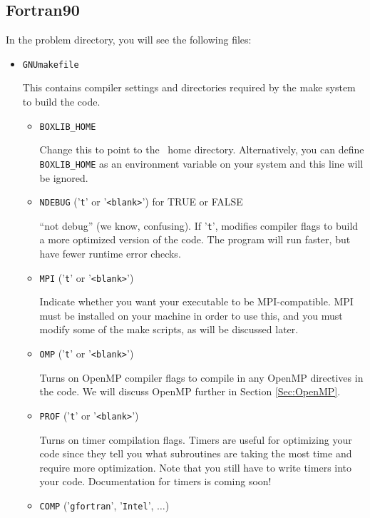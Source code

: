 \subsection{Fortran90}

In the problem directory, you will see the following files:
\begin{itemize}
\item {\tt GNUmakefile}

This contains compiler settings and directories required by the make system to build the code.

  \begin{itemize}

    \item {\tt BOXLIB\_HOME}

    Change this to point to the \BoxLib\ home directory.  Alternatively, you can define {\tt BOXLIB\_HOME}
    as an environment variable on your system and this line will be ignored.

    \item {\tt NDEBUG} ('{\tt t}' or '{\tt <blank>}') for TRUE or FALSE
      
    ``not debug'' (we know, confusing).  If '{\tt t}', modifies compiler flags to build a 
    more optimized version of the code.  The program will run faster, but have fewer 
    runtime error checks.

    \item {\tt MPI} ('{\tt t}' or '{\tt <blank>}')

    Indicate whether you want your executable to be MPI-compatible.  MPI must be installed on your
    machine in order to use this, and you must modify some of the make scripts, as will be 
    discussed later.

    \item {\tt OMP} ('{\tt t}' or '{\tt <blank>}')

    Turns on OpenMP compiler flags to compile in any OpenMP directives in the code.
    We will discuss OpenMP further in Section \ref{Sec:OpenMP}.

    \item {\tt PROF} ('{\tt t}' or '{\tt <blank>}')

    Turns on timer compilation flags.  Timers are useful for optimizing your code since they tell you 
    what subroutines are taking the most time and require more optimization.  Note that you still have 
    to write timers into your code.  Documentation for timers is coming soon!

    \item {\tt COMP} ('{\tt gfortran}', '{\tt Intel}', $\ldots$)


\end{itemize}
\end{itemize}
